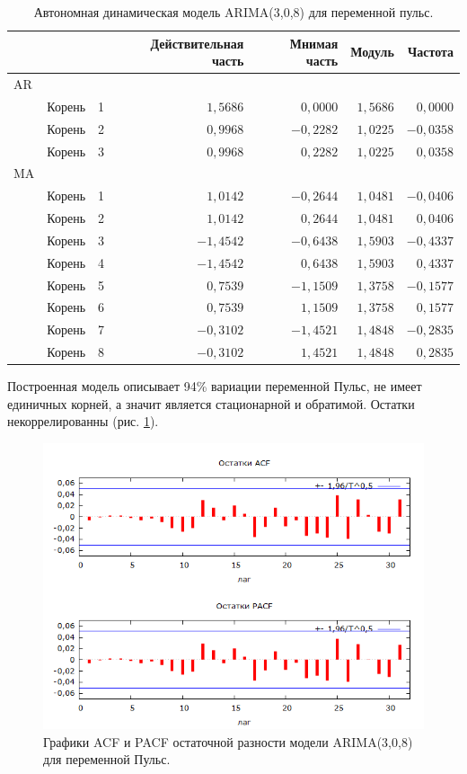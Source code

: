 \documentclass[a4paper,12pt]{article}
\begin{document}
\begin{table}[H]
\begin{center}
		
		\vspace{1em}
		
		\begin{tabular}{llrrrrr}
			& & & Действительная часть & Мнимая часть & Модуль & Частота \\ \hline
			AR \\ 
			& Корень & 1 & $1,5686$ & $0,0000$ & $1,5686$ & $0,0000$ \\ 
			& Корень & 2 & $0,9968$ & $-0,2282$ & $1,0225$ & $-0,0358$ \\ 
			& Корень & 3 & $0,9968$ & $0,2282$ & $1,0225$ & $0,0358$ \\ 
			MA \\ 
			& Корень & 1 & $1,0142$ & $-0,2644$ & $1,0481$ & $-0,0406$ \\ 
			& Корень & 2 & $1,0142$ & $0,2644$ & $1,0481$ & $0,0406$ \\ 
			& Корень & 3 & $-1,4542$ & $-0,6438$ & $1,5903$ & $-0,4337$ \\ 
			& Корень & 4 & $-1,4542$ & $0,6438$ & $1,5903$ & $0,4337$ \\ 
			& Корень & 5 & $0,7539$ & $-1,1509$ & $1,3758$ & $-0,1577$ \\ 
			& Корень & 6 & $0,7539$ & $1,1509$ & $1,3758$ & $0,1577$ \\ 
			& Корень & 7 & $-0,3102$ & $-1,4521$ & $1,4848$ & $-0,2835$ \\ 
			& Корень & 8 & $-0,3102$ & $1,4521$ & $1,4848$ & $0,2835$ \\ \hline
		\end{tabular}
		
	\end{center}
	\caption{Автономная динамическая модель ARIMA(3,0,8) для переменной пульс.}
	\label{tab:ARIMAhr}
\end{table}

Построенная модель описывает 94\% вариации переменной Пульс, не имеет единичных корней, а значит является стационарной и обратимой. Остатки некоррелированны (рис. \ref{fig:hr_arima}).

\begin{figure}[H]
	\centering
	\includegraphics[width=0.5\linewidth]{../[graphics]/hr_arima.png}
	\caption{Графики ACF и PACF остаточной разности модели ARIMA(3,0,8) для переменной Пульс.}
	\label{fig:hr_arima}
\end{figure}
\end{document}
